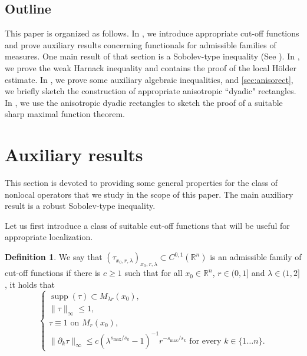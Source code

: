 \documentclass[11pt]{amsart}
\theoremstyle{plain}
\theoremstyle{definition}
\newtheorem{definition}[theorem]{Definition}
\numberwithin{equation}{section}
\newcommand{\R}{\mathbb{R}}
\DeclareMathOperator{\supp}{supp}
\begin{document}
\subsection*{Outline} This paper is organized as follows. In , we introduce appropriate cut-off functions and prove auxiliary results concerning functionals for admissible families of measures. One main result of that section is a Sobolev-type inequality (See ). In , we prove the weak Harnack inequality and  contains the proof of the local H\"older estimate. In , we prove some auxiliary algebraic inequalities, and \autoref{sec:anisorect}, we briefly sketch the construction of appropriate anisotropic ``dyadic" rectangles. In , we use the anisotropic dyadic rectangles to sketch the proof of a suitable sharp maximal function theorem.



\section{Auxiliary results}\label{sec:aux}
This section is devoted to providing some general properties for the class of nonlocal operators that we study in the scope of this paper. The main auxiliary result is a robust Sobolev-type inequality.
  
Let us first introduce a class of suitable cut-off functions that will be useful for appropriate localization.

\begin{definition} \label{def:cut-off}
We say that $(\tau_{x_0,r,\lambda})_{x_0,r,\lambda} \subset C^{0,1}(\R^n)$ is an admissible family of cut-off functions if there is 
$c \ge 1$ such that for all $x_0 \in \R^n$, $r \in (0,1]$ and $\lambda \in (1,2]$, it holds that
\[ \begin{cases}
\supp(\tau) \subset M_{\lambda r}(x_0), \\
\| \tau \|_{\infty} \le 1, \\
\tau \equiv 1 \text{ on } M_r(x_0), \\
\| \partial_k \tau \|_{\infty} \le c \left( \lambda^{s_{\max}/s_k} -1 \right)^{-1}r^{-s_{\max}/s_k} \text{ for every } k \in \lbrace 1 \dots n \rbrace.
\end{cases} \]
\end{definition}
\end{document}

